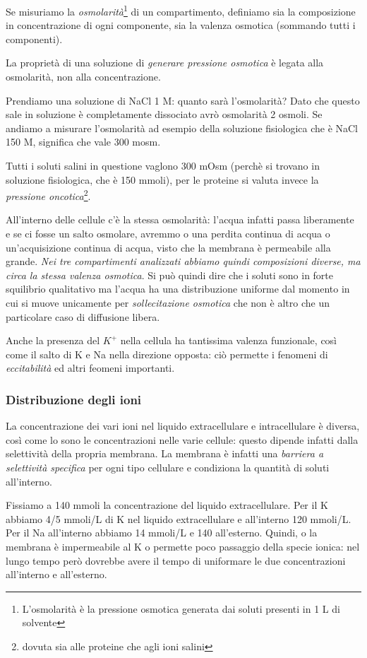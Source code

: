 \documentclass[a4paper,12pt]{article}
\begin{document}
Se misuriamo la \emph{osmolarità}\footnote{L'osmolarità è la pressione osmotica generata dai soluti presenti in 1 L di solvente} di un compartimento, definiamo sia la composizione in concentrazione di ogni componente, sia la valenza osmotica (sommando tutti i componenti).

La proprietà di una soluzione di \emph{generare pressione osmotica} è legata alla osmolarità, non alla concentrazione.

Prendiamo una soluzione di NaCl 1 M: quanto sarà l'osmolarità?
Dato che questo sale in soluzione è completamente dissociato avrò osmolarità 2 osmoli. Se andiamo a misurare l'osmolarità ad esempio della soluzione fisiologica che è NaCl 150 M, significa che vale 300 mosm.

Tutti i soluti salini in questione vaglono 300 mOsm (perchè si trovano in soluzione fisiologica, che è 150 mmoli), per le proteine si valuta invece la \emph{pressione oncotica}\footnote{dovuta sia alle proteine che agli ioni salini}.

All'interno delle cellule c'è la stessa osmolarità: l'acqua infatti passa liberamente e se ci fosse un salto osmolare, avremmo o una perdita continua di acqua o un'acquisizione continua di acqua, visto che la membrana è permeabile alla grande. \emph{Nei tre compartimenti analizzati abbiamo quindi composizioni diverse, ma circa la stessa valenza osmotica}. Si può quindi dire che i soluti sono in forte squilibrio qualitativo ma l'acqua ha una distribuzione uniforme dal momento in cui si muove unicamente per \emph{sollecitazione osmotica} che non è altro che un particolare caso di diffusione libera.

Anche la presenza del $K^{+}$ nella cellula ha tantissima valenza funzionale, così come il salto di K e Na nella direzione opposta: ciò permette i fenomeni di \emph{eccitabilità} ed altri feomeni importanti.

\subsubsection{Distribuzione degli ioni}

La concentrazione dei vari ioni nel liquido extracellulare e intracellulare è diversa, così come lo sono le concentrazioni nelle varie cellule: questo dipende infatti dalla selettività della propria membrana. La membrana è infatti una \emph{barriera a selettività specifica} per ogni tipo cellulare e condiziona la quantità di soluti all'interno.

Fissiamo a 140 mmoli la concentrazione del liquido extracellulare. Per il K abbiamo 4/5 mmoli/L di K nel liquido extracellulare e all'interno 120 mmoli/L. Per il Na all'interno abbiamo 14 mmoli/L e 140 all'esterno.
Quindi, o la membrana è impermeabile al K o permette poco passaggio della specie ionica: nel lungo tempo però dovrebbe avere il tempo di uniformare le due concentrazioni all'interno e all'esterno.
\end{document}

